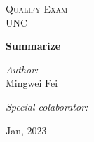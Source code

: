 \begin{titlepage}
\vbox{ }

\vbox{ }

\begin{center}
\textsc{\LARGE Qualify Exam}\\[1.5cm]
\textsc{\Large UNC}\\[0.5cm]

\vbox{ }

{ \huge \bfseries Summarize}\\[0.4cm]

\begin{minipage}{0.4\textwidth}
\begin{flushleft} \large
\emph{Author:}\\
Mingwei Fei
\end{flushleft}
\end{minipage}
\begin{minipage}{0.4\textwidth}
\begin{flushright} \large
\emph{Special colaborator:} \\

\end{flushright}
\end{minipage}
\vfill
{\large Jan, 2023}
\end{center}
\end{titlepage}